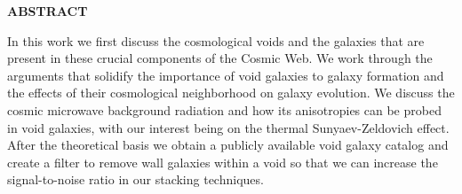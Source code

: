 \begin{center}
{\large {\bf  ABSTRACT }}

In this work we first discuss the cosmological voids and the galaxies that are present in these crucial components of the Cosmic Web. We work through the arguments that solidify the importance of void galaxies to galaxy formation and the effects of their cosmological neighborhood on galaxy evolution. We discuss the cosmic microwave background radiation and how its anisotropies can be probed in void galaxies, with our interest being on the thermal Sunyaev-Zeldovich effect. After the theoretical basis we obtain a publicly available void galaxy catalog and create a filter to remove wall galaxies within a void so that we can increase the signal-to-noise ratio in our stacking techniques.
\end{center}  


    

